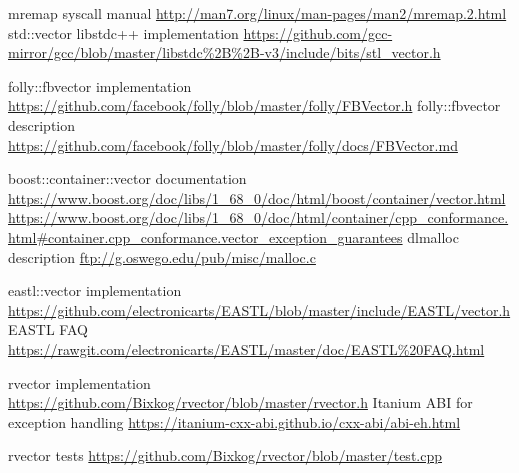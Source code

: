\documentclass[inz, english, shortabstract]{iithesis}
\begin{document}
\begin{thebibliography}{1}
 mremap syscall manual \url{http://man7.org/linux/man-pages/man2/mremap.2.html}
 std::vector libstdc++ implementation \url{https://github.com/gcc-mirror/gcc/blob/master/libstdc%2B%2B-v3/include/bits/stl_vector.h}

 folly::fbvector implementation \url{https://github.com/facebook/folly/blob/master/folly/FBVector.h}
 folly::fbvector description \url{https://github.com/facebook/folly/blob/master/folly/docs/FBVector.md}

 boost::container::vector documentation \url{https://www.boost.org/doc/libs/1_68_0/doc/html/boost/container/vector.html}
 \url{https://www.boost.org/doc/libs/1_68_0/doc/html/container/cpp_conformance.html#container.cpp_conformance.vector_exception_guarantees}
 dlmalloc description \url{ftp://g.oswego.edu/pub/misc/malloc.c}

 eastl::vector implementation \url{https://github.com/electronicarts/EASTL/blob/master/include/EASTL/vector.h}
 EASTL FAQ \url{https://rawgit.com/electronicarts/EASTL/master/doc/EASTL%20FAQ.html}

 rvector implementation \url{https://github.com/Bixkog/rvector/blob/master/rvector.h}
 Itanium ABI for exception handling \url{https://itanium-cxx-abi.github.io/cxx-abi/abi-eh.html}

 rvector tests \url{https://github.com/Bixkog/rvector/blob/master/test.cpp}
\end{thebibliography}


\listoffigures
\lstlistoflistings
\end{document}
